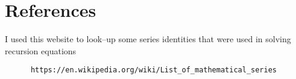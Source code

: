 \documentclass{article}
\begin{document}
  \section*{References}

    I used this website to look--up some series identities that were used in  solving recursion equations
    \begin{verbatim}
      https://en.wikipedia.org/wiki/List_of_mathematical_series
    \end{verbatim}
\end{document}
